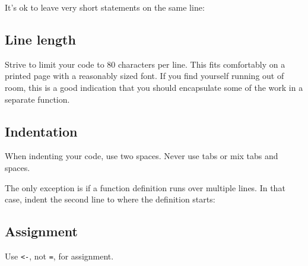 It's ok to leave very short statements on the same line:

\begin{Shaded}
\begin{Highlighting}[]
\StringTok{ } \NormalTok{&&}\StringTok{ }\NormalTok{(}\NormalTok{)}
\end{Highlighting}
\end{Shaded}

\subsection{Line length}

Strive to limit your code to 80 characters per line. This fits
comfortably on a printed page with a reasonably sized font. If you find
yourself running out of room, this is a good indication that you should
encapsulate some of the work in a separate function.

\subsection{Indentation}

When indenting your code, use two spaces. Never use tabs or mix tabs and
spaces.

The only exception is if a function definition runs over multiple lines.
In that case, indent the second line to where the definition starts:

\begin{Shaded}
\begin{Highlighting}[]
\StringTok{ } \NormalTok{, }
                                \NormalTok{,}
                                \NormalTok{) \{}
\NormalTok{\}}
\end{Highlighting}
\end{Shaded}

\subsection{Assignment}

Use \texttt{\textless{}-}, not \texttt{=}, for assignment.

